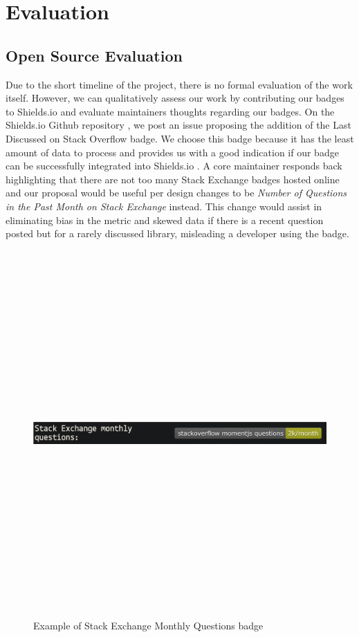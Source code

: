 \documentclass[12pt, letterpaper]{article}
\begin{document}
\section{Evaluation}

\subsection{Open Source Evaluation}

Due to the short timeline of the project, there is no formal evaluation of the work itself.
However, we can qualitatively assess our work by contributing our badges to Shields.io \cite{shields}
and evaluate maintainers thoughts regarding our badges. On the Shields.io Github repository \cite{shieldsrepo}, 
we post an issue \cite{shieldsissue} proposing the addition of the Last Discussed on Stack Overflow badge.
We choose this badge because it has the least amount of data to process and provides us with a good indication
if our badge can be successfully integrated into Shields.io \cite{shields}.
A core maintainer responds back highlighting that there are not too many Stack Exchange badges hosted online
and our proposal would be
useful per design changes to be \textit{Number of Questions in the Past Month on Stack Exchange} instead. 
This change would assist in eliminating bias in the metric and skewed data if there is a recent question posted but
for a rarely discussed library, misleading a developer using the badge.


\begin{figure}[!htb]
    \centerline{
        \includegraphics[width=14cm,height=14cm,keepaspectratio=true]{semonthlybadge}
    }
    \caption{
        Example of Stack Exchange Monthly Questions badge
    }
    \label{semonthlybadge}
\end{figure}
\end{document}
